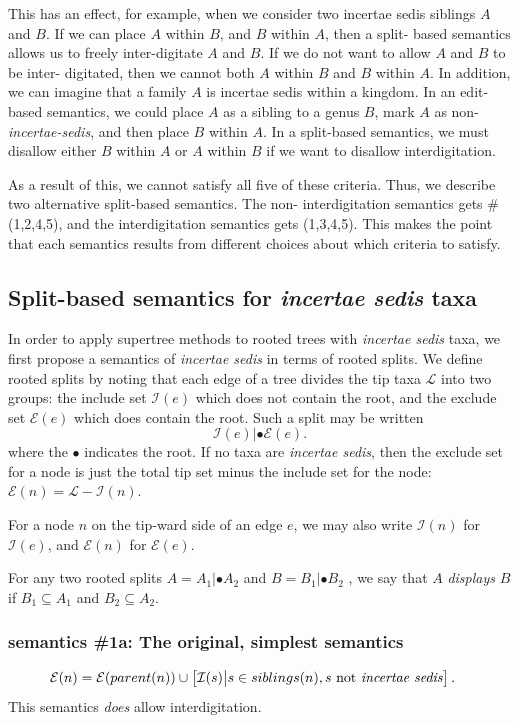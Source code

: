 \documentclass[english]{article}
\begin{document}
This has an effect, for example, when we consider two incertae sedis
siblings $A$ and $B$.
If we can place $A$ within $B$, and $B$ within
$A$, then a split- based semantics allows us to freely inter-digitate
$A$ and $B$.
If we do not want to allow $A$ and $B$ to be inter-
digitated, then we cannot both $A$ within $B$ and $B$ within $A$.
In
addition, we can imagine that a family $A$ is incertae sedis within a
kingdom.
In an edit-based semantics, we could place $A$ as a sibling
to a genus $B$, mark $A$ as non-\emph{incertae-sedis}, and then place
$B$ within $A$.
In a split-based semantics, we must disallow either
$B$ within $A$ or $A$ within $B$ if we want to disallow
interdigitation.

As a result of this, we cannot satisfy all five of these criteria.
Thus, we describe two alternative split-based semantics.
The non-
interdigitation semantics gets \# (1,2,4,5), and the interdigitation
semantics gets (1,3,4,5).
This makes the point that each semantics
results from different choices about which criteria to satisfy.

\subsection{Split-based semantics for \emph{incertae sedis} taxa}

In order to apply supertree methods to rooted trees with
\emph{incertae sedis} taxa, we first propose a semantics of
\emph{incertae sedis }in terms of rooted splits.
We define rooted
splits by noting that each edge of a tree divides the tip taxa
$\mathcal{L}$ into two groups: the include set $\mathcal{I}(e)$ which
does not contain the root, and the exclude set $\mathcal{E}(e)$ which
does contain the root.
Such a split may be written \[
\mathcal{I}(e)|\bullet\mathcal{E}(e).
\] where the $\bullet$ indicates
the root.
If no taxa are \emph{incertae sedis}, then the exclude set
for a node is just the total tip set minus the include set for the
node: $ \mathcal{E}(n) =\mathcal{L}-\mathcal{I}(n)$.


For a node $n$ on the tip-ward side of an edge $e$, we may also write
$\mathcal{I}(n)$ for $\mathcal{I}(e)$, and $\mathcal{E}(n)$ for
$\mathcal{E}(e)$.

For any two rooted splits $A=A_{1}|\bullet A_{2}$ and $B=B_{1}|\bullet
B_{2}$ , we say that $A$ \emph{displays }$B$ if $B_{1}\subseteq A_{1}$
and $B_{2}\subseteq A_{2}$.

\subsubsection{semantics \#1a: The original, simplest semantics}
\begin{align}
    \mathcal{E}(n) & = \mathcal{E}(parent(n))\cup\left[\mathcal{I}(s)\big|s\in
           siblings(n), s \text{ not \emph{incertae sedis}}\right].\label{eq:exclude-set-formula-1a}
\end{align}
This semantics \emph{does} allow interdigitation.
\end{document}

